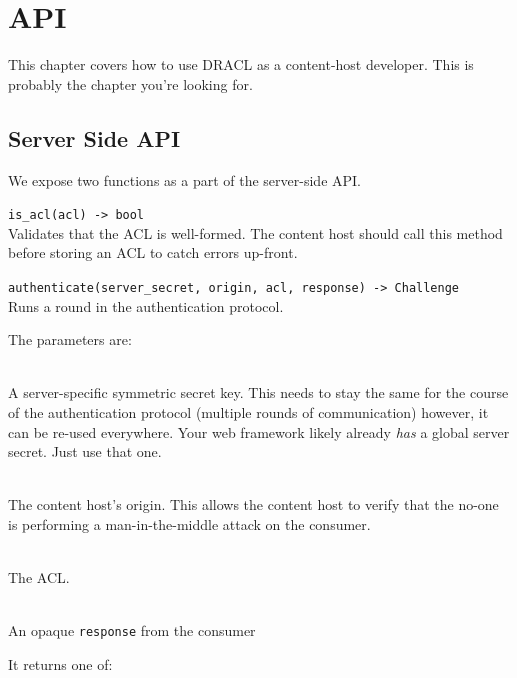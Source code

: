 \documentclass[pdftex,12pt,a4papaer,twoside,notitlepage]{report}
\begin{document}
\chapter{API}
\label{chap:api}

This chapter covers how to use DRACL as a content-host developer. This is
probably the chapter you're looking for.

\section{Server Side API}

We expose two functions as a part of the server-side API.

\begin{compactitem}[$\lambda$]
\item \verb=is_acl(acl) -> bool= \\
  Validates that the ACL is well-formed. The content host should call this
  method before storing an ACL to catch errors up-front.
\item \verb=authenticate(server_secret, origin, acl, response) -> Challenge= \\
  Runs a round in the authentication protocol.

  The parameters are:

  \begin{description}[labelindent=2em,leftmargin=4em]
  \item[\texttt{server\_secret}] \hfill \\
    A server-specific symmetric secret key. This needs to stay the same for the
    course of the authentication protocol (multiple rounds of communication)
    however, it can be re-used everywhere. Your web framework likely already
    \emph{has} a global server secret. Just use that one.
  \item[\texttt{origin}] \hfill \\
    The content host's origin. This allows the content host to verify that the
    no-one is performing a man-in-the-middle attack on the consumer.
  \item[\texttt{acl}] \hfill \\
    The ACL.
  \item[\texttt{response}] \hfill \\
    An opaque \texttt{response} from the consumer
  \end{description}

  It returns one of:


\end{compactitem}
\end{document}
